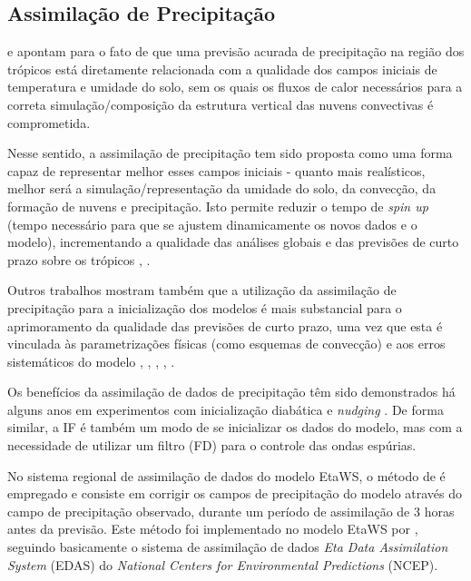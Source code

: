 \subsection{Assimilação de Precipitação}

\cite{krishnamurty91} e \cite{nunesroads05} apontam para o fato de que uma previsão acurada de precipitação na região dos trópicos está diretamente relacionada com a qualidade dos campos iniciais de temperatura e umidade do solo, sem os quais os fluxos de calor necessários para a correta simulação/composição da estrutura vertical das nuvens convectivas é comprometida.

Nesse sentido, a assimilação de precipitação tem sido proposta como uma forma capaz de representar melhor esses campos iniciais - quanto mais realísticos, melhor será a simulação/representação da umidade do solo, da convecção, da formação de nuvens e precipitação. Isto permite reduzir o tempo de \textit{spin up} (tempo necessário para que se ajustem dinamicamente os novos dados e o modelo), incrementando a qualidade das análises globais e das previsões de curto prazo sobre os trópicos \cite{heckley90}, \cite{falkovichetal00}.

Outros trabalhos mostram também que a utilização da assimilação de precipitação para a inicialização dos modelos é mais substancial para o aprimoramento da qualidade das previsões de curto prazo, uma vez que esta é vinculada às parametrizações físicas (como esquemas de convecção) e aos erros sistemáticos do modelo \cite{kasaharaetal94}, \cite{mathur95}, \cite{zupanskimesinger95}, \cite{nunescocke04}, \cite{messinger05}.

Os benefícios da assimilação de dados de precipitação têm sido demonstrados há alguns anos em experimentos com inicialização diabática e \textit{nudging} \cite{zupanskimesinger95}. De forma similar, a IF é também um modo de se inicializar os dados do modelo, mas com a necessidade de utilizar um filtro (FD) para o controle das ondas espúrias.

No sistema regional de assimilação de dados do modelo EtaWS, o método de \cite{carrbaldwin91} é empregado e consiste em corrigir os campos de precipitação do modelo através do campo de precipitação observado, durante um período de assimilação de 3 horas antes da previsão. Este método foi implementado no modelo EtaWS por \cite{fernandez08}, seguindo basicamente o sistema de assimilação de dados \textit{Eta Data Assimilation System} (EDAS) do \textit{National Centers for Environmental Predictions} (NCEP).

